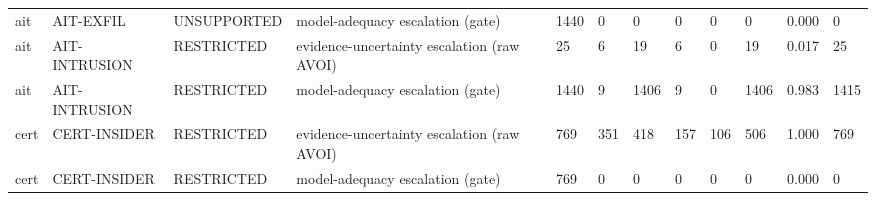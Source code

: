 \begin{table}[!ht]
{\begin{tabular}{llllllllllll}
ait & AIT-EXFIL & UNSUPPORTED & model-adequacy escalation (gate) & 1440 & 0 & 0 & 0 & 0 & 0 & 0.000 & 0 \\
ait & AIT-INTRUSION & RESTRICTED & evidence-uncertainty escalation (raw AVOI) & 25 & 6 & 19 & 6 & 0 & 19 & 0.017 & 25 \\
ait & AIT-INTRUSION & RESTRICTED & model-adequacy escalation (gate) & 1440 & 9 & 1406 & 9 & 0 & 1406 & 0.983 & 1415 \\
cert & CERT-INSIDER & RESTRICTED & evidence-uncertainty escalation (raw AVOI) & 769 & 351 & 418 & 157 & 106 & 506 & 1.000 & 769 \\
cert & CERT-INSIDER & RESTRICTED & model-adequacy escalation (gate) & 769 & 0 & 0 & 0 & 0 & 0 & 0.000 & 0 \\
\bottomrule
\end{tabular}}
\end{table}
